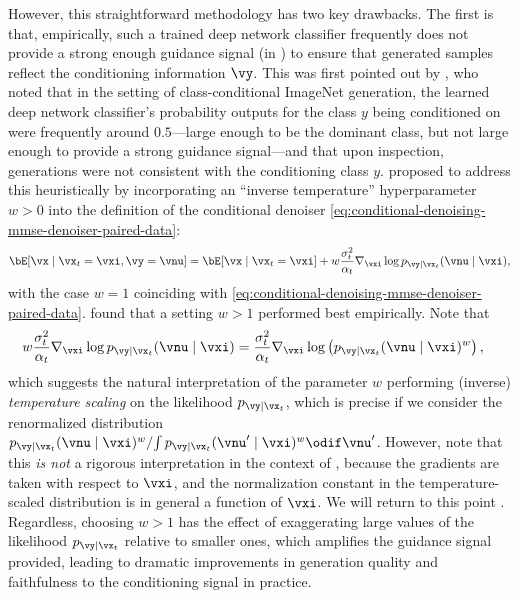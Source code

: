 \documentclass[../../book-main.tex]{subfiles}
\begin{document}
However, this straightforward methodology has two key drawbacks. The first is
that, empirically, such a trained deep network classifier frequently does not
provide a strong enough guidance signal (in
) to ensure that
generated samples reflect the conditioning information $\vy$. This was first
pointed out by \citet{Dhariwal2021-hg}, who noted that in the setting of
class-conditional ImageNet generation, the learned deep network
classifier's probability outputs for the class $y$ being conditioned on were
frequently around
$0.5$---large enough to be the dominant class, but not large enough to provide
a strong guidance signal---and that upon inspection, generations were not
consistent with the conditioning class $y$. \citet{Dhariwal2021-hg} proposed to
address this heuristically by incorporating an ``inverse temperature'' hyperparameter $w > 0$
into the definition of the conditional denoiser
\eqref{eq:conditional-denoising-mmse-denoiser-paired-data}:
\begin{equation}\label{eq:denoiser-classifier-guidance}
  \bE[ \vx \mid \vx_t=\vxi, \vy=\vnu]
  =
  \bE[\vx \mid \vx_t=\vxi] 
  + w\frac{\sigma_t^2}{\alpha_t} \nabla_{\vxi}\log p_{\vy \mid \vx_t}(\vnu\mid
  \vxi),
\end{equation}
with the case $w = 1$ coinciding with
\eqref{eq:conditional-denoising-mmse-denoiser-paired-data}.
\citet{Dhariwal2021-hg} found that a setting $w > 1$ performed best empirically.
Note that
\begin{align}
  w\frac{\sigma_t^2}{\alpha_t} \nabla_{\vxi}\log p_{\vy \mid \vx_t}(\vnu\mid
  \vxi)
  &=
  \frac{\sigma_t^2}{\alpha_t} \nabla_{\vxi}\log \left(
  p_{\vy \mid \vx_t}(\vnu\mid \vxi)^w
  \right), %
\end{align}
which suggests the natural interpretation of the parameter $w$ performing
(inverse) \textit{temperature scaling} on the likelihood
$p_{\vy \mid \vx_t}$, which is precise if we consider the renormalized
distribution 
$ { p_{\vy \mid \vx_t}(\vnu\mid \vxi)^w } / { \int p_{\vy \mid \vx_t}(\vnu'\mid
\vxi)^w \odif \vnu' } $.
However, note that this \textit{is not} a rigorous interpretation in the context
of , because the
gradients are taken with respect to $\vxi$, and the normalization constant in
the temperature-scaled distribution is in general a function of $\vxi$.
We will return to this point .
Regardless, choosing $w > 1$ has the effect of exaggerating large values of the
likelihood $p_{\vy \mid \vx_t}$ relative to smaller ones, which amplifies the
guidance signal provided, leading to dramatic improvements in generation quality
and faithfulness to the conditioning signal in practice.
\end{document}
